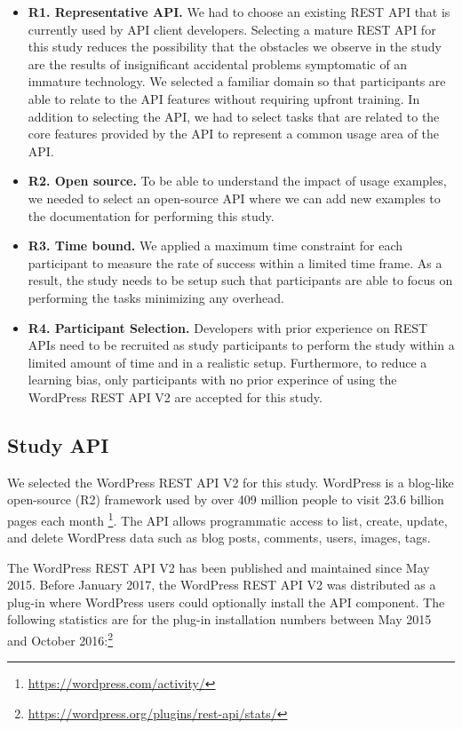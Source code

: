 \documentclass[conference]{IEEEtran}
\begin{document}
\begin{itemize}
  \item \textbf{R1. Representative API.} We had to choose an existing REST API that is currently used by API client developers. Selecting a mature REST API for this study reduces the possibility that the obstacles we observe in the study are the results of insignificant accidental problems symptomatic of an immature technology. We selected a familiar domain so that participants are able to relate to the API features without requiring upfront training. In addition to selecting the API, we had to select tasks that are related to the core features provided by the API to represent a common usage area of the API.
  \item \textbf{R2. Open source.} To be able to understand the impact of usage examples, we needed to select an open-source API where we can add new examples to the documentation for performing this study.
  \item \textbf{R3. Time bound.} We applied a maximum time constraint for each participant to measure the rate of success within a limited time frame. As a result, the study needs to be setup such that participants are able to focus on performing the tasks minimizing any overhead.
  \item \textbf{R4. Participant Selection.} Developers with prior experience on REST APIs need to be recruited as study participants to perform the study within a limited amount of time and in a realistic setup. Furthermore, to reduce a learning bias, only participants with no prior experince of using the WordPress REST API V2 are accepted for this study.
\end{itemize}


\subsection{Study API} %

We selected the WordPress REST API V2 for this study. WordPress is a blog-like open-source (R2) framework used by over 409 million people to visit 23.6 billion pages each month \footnote{\url{https://wordpress.com/activity/}}. The API allows programmatic access to list, create, update, and delete WordPress data such as blog posts, comments, users, images, tags.

The WordPress REST API V2 has been published and maintained since May 2015. Before January 2017, the WordPress REST API V2 was distributed as a plug-in where WordPress users could optionally install the API component. The following statistics are for the plug-in installation numbers between May 2015 and October 2016:\footnote{\url{https://wordpress.org/plugins/rest-api/stats/}}
\end{document}

